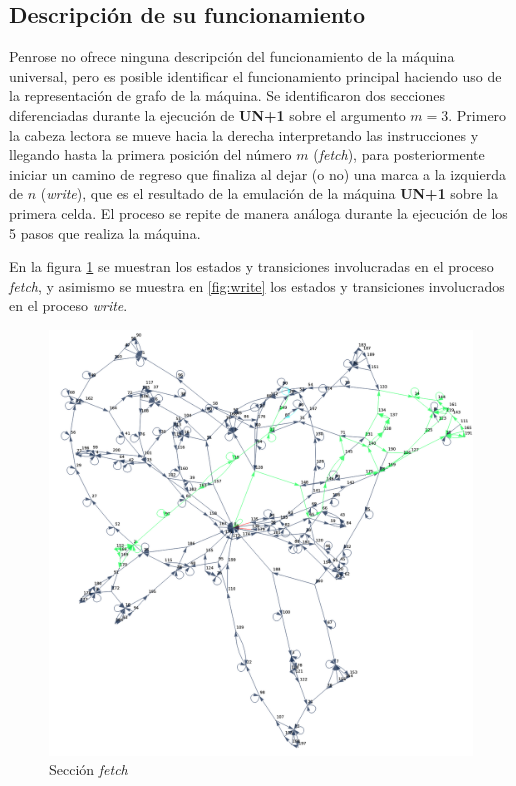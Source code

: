 \documentclass[10pt,a4paper]{article}
\begin{document}
\subsection{Descripción de su funcionamiento}
Penrose no ofrece ninguna descripción del funcionamiento de la máquina universal, pero es posible identificar el funcionamiento principal haciendo uso de la representación de grafo de la máquina. Se identificaron dos secciones diferenciadas durante la ejecución de \textbf{UN+1} sobre el argumento $m = 3$. Primero la cabeza lectora se mueve hacia la derecha interpretando las instrucciones y llegando hasta la primera posición del número $m$ (\textit{fetch}), para posteriormente iniciar un camino de regreso que finaliza al dejar (o no) una marca a la izquierda de $n$ (\textit{write}), que es el resultado de la emulación de la máquina \textbf{UN+1} sobre la primera celda. El proceso se repite de manera análoga durante la ejecución de los 5 pasos que realiza la máquina.

En la figura \ref{fig:fetch} se muestran los estados y transiciones involucradas en el proceso \textit{fetch}, y asimismo se muestra en \ref{fig:write} los estados y transiciones involucrados en el proceso \textit{write}.

\begin{figure}[h!tb!]
	\centering
	\includegraphics[scale=0.35]{../img/fetchSection.png}
	\caption{Sección \textit{fetch}}
	\label{fig:fetch}
\end{figure}
\end{document}

